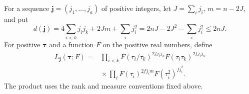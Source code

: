 For a sequence $\mathbf j=(j_1,\ldots,j_a)$ of
positive integers, let $J=\sum_i j_i$, $m=n-2J$,
and put
\begin{equation}\label{nu-dimension}
 d(\mathbf j)=4\sum_{i<k}j_ij_k+2Jm+\sum_i j_i^2
             =2nJ-2J^2-\sum_i j_i^2\le2nJ.
\end{equation}
For positive $\boldsymbol\tau$ and a function $F$
on the positive real numbers, define
\begin{equation}\label{nu-layer-product}
 \begin{split}
 L_{\mathbf j}(\boldsymbol\tau;F)
 ={}&\prod_{i<k}
       F(\tau_i/\tau_k)^{2fj_ij_k}
       F(\tau_i\tau_k)^{2fj_ij_k}\\
    &{}\times\prod_i
       F(\tau_i)^{2fj_im}F(\tau_i^2)^{fj_i^2}.
 \end{split}
\end{equation}
The product uses the rank and measure conventions fixed above.

